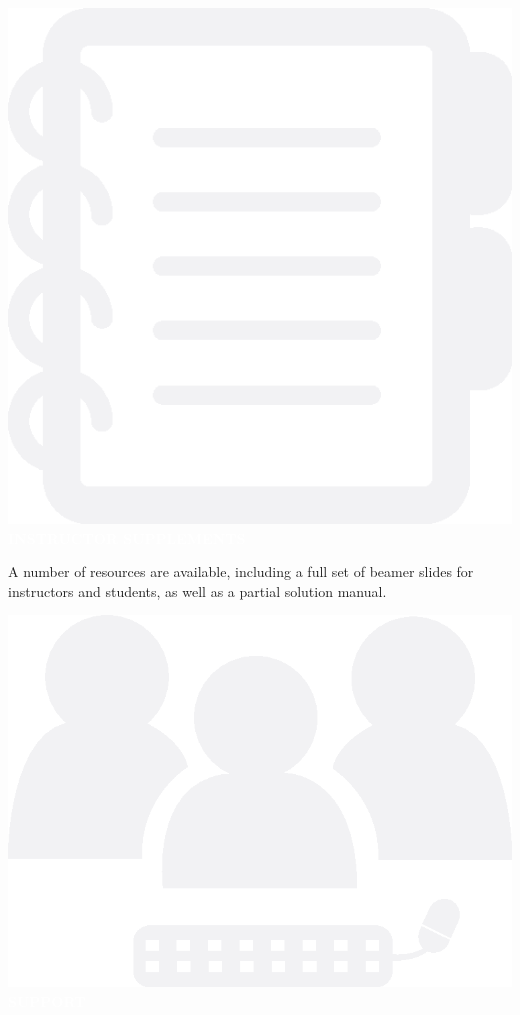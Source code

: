 \begin{center}
\begin{lscshdrbox}
\includegraphics[scale=0.08]{images/component-supplement.eps}\hspace{10.25em}\textcolor{white}{\textbf{INSTRUCTOR SUPPLEMENTS}}
\end{lscshdrbox}
\end{center}

\begin{center}
	\parbox{0.9\linewidth}{
		A number of resources are available, including a full set of beamer slides for instructors and students,
		as well as a partial solution manual.
	}
\end{center}

\begin{center}
\begin{lscshdrbox}
\includegraphics[scale=0.08]{images/component-support.eps}\hspace{14.6em}\textcolor{white}{\textbf{SUPPORT}}
\end{lscshdrbox}
\end{center}

